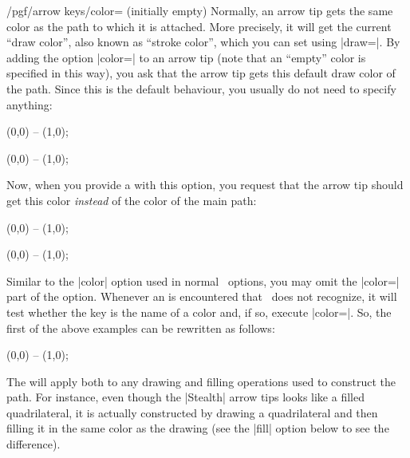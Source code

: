 \begin{key}{/pgf/arrow keys/color= (initially \normalfont empty)}
    Normally, an arrow tip gets the same color as the path to which it is
    attached. More precisely, it will get the current ``draw color'', also
    known as ``stroke color'', which you can set using |draw=|. By adding the option |color=| to an arrow tip (note that an
    ``empty'' color is specified in this way), you ask that the arrow tip gets
    this default draw color of the path. Since this is the default behaviour,
    you usually do not need to specify anything:
\begin{codeexample}[width=3cm,preamble={\usetikzlibrary{arrows.meta}}]
 \draw [red, arrows = {-Stealth}] (0,0) -- (1,0);
\end{codeexample}
\begin{codeexample}[width=3cm,preamble={\usetikzlibrary{arrows.meta}}]
 \draw [blue, arrows = {-Stealth}] (0,0) -- (1,0);
\end{codeexample}

    Now, when you provide a  with this option, you request that the
    arrow tip should get this color \emph{instead} of the color of the main
    path:
\begin{codeexample}[width=3cm,preamble={\usetikzlibrary{arrows.meta}}]
 \draw [red, arrows = {-Stealth[color=blue]}] (0,0) -- (1,0);
\end{codeexample}
\begin{codeexample}[width=3cm,preamble={\usetikzlibrary{arrows.meta}}]
 \draw [red, arrows = {-Stealth[color=black]}] (0,0) -- (1,0);
\end{codeexample}

    Similar to the |color| option used in normal \tikzname\ options, you may
    omit the |color=| part of the option. Whenever an  is
    encountered that \tikzname\ does not recognize, it will test whether the
    key is the name of a color and, if so, execute |color=|.
    So, the first of the above examples can be rewritten as follows:
\begin{codeexample}[width=3cm,preamble={\usetikzlibrary{arrows.meta}}]
 \draw [red, arrows = {-Stealth[blue]}] (0,0) -- (1,0);
\end{codeexample}

    The  will apply both to any drawing and filling operations used
    to construct the path. For instance, even though the |Stealth| arrow tips
    looks like a filled quadrilateral, it is actually constructed by drawing a
    quadrilateral and then filling it in the same color as the drawing (see the
    |fill| option below to see the difference).


\end{key}
